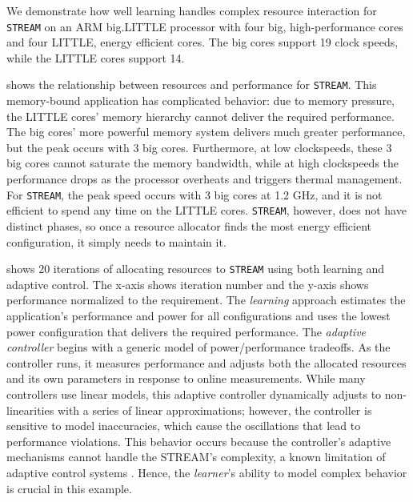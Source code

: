 We demonstrate how well learning handles complex resource interaction
for \texttt{STREAM} on an ARM big.LITTLE processor with four big,
high-performance cores and four LITTLE, energy efficient cores.  The
big cores support 19 clock speeds, while the LITTLE cores support 14.


 shows the relationship between resources
and performance for \texttt{STREAM}.  This memory-bound application
has complicated behavior: due to memory pressure, the LITTLE cores'
memory hierarchy cannot deliver the required performance.  The big
cores' more powerful memory system delivers much greater performance,
but the peak occurs with 3 big cores.  Furthermore, at low
clockspeeds, these 3 big cores cannot saturate the memory bandwidth,
while at high clockspeeds the performance drops as the processor
overheats and triggers thermal management.  For \texttt{STREAM}, the
peak speed occurs with 3 big cores at 1.2 GHz, and it is not efficient
to spend any time on the LITTLE cores.  \texttt{STREAM}, however, does
not have distinct phases, so once a resource allocator finds the most
energy efficient configuration, it simply needs to maintain it.

 shows 20 iterations of allocating
resources to \texttt{STREAM} using both learning and adaptive control.
The x-axis shows iteration number and the y-axis shows performance
normalized to the requirement.  The \emph{learning} approach estimates
the application's performance and power for all configurations and
uses the lowest power configuration that delivers the required
performance.  The \emph{adaptive controller} begins with a generic
model of power/performance tradeoffs.  As the controller runs, it
measures performance and adjusts both the allocated resources and its
own parameters in response to online measurements.  While many
controllers use linear models, this adaptive controller dynamically
adjusts to non-linearities with a series of linear approximations;
however, the controller is sensitive to model inaccuracies, which
cause the oscillations that lead to performance violations.  This
behavior occurs because the controller's adaptive mechanisms cannot
handle the STREAM's complexity, a known limitation of adaptive control
systems \cite{ControlWare,POET,ICSE2014}.  Hence, the \emph{learner}'s
ability to model complex behavior is crucial in this example.


